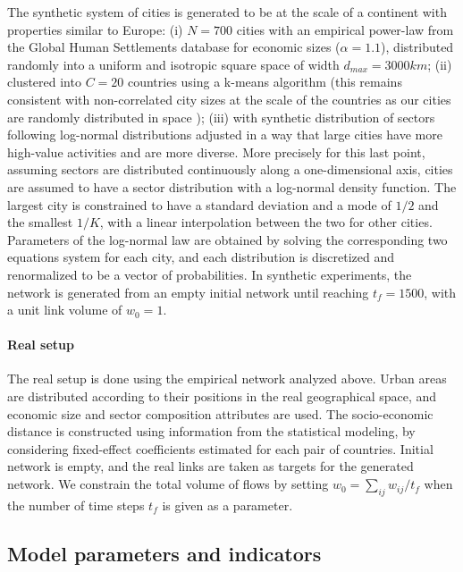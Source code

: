 \documentclass[11pt]{article}
\begin{document}
The synthetic system of cities is generated to be at the scale of a continent with properties similar to Europe: (i) $N=700$ cities with an empirical power-law from the Global Human Settlements database for economic sizes ($\alpha = 1.1$), distributed randomly into a uniform and isotropic square space of width $d_{max}=3000km$; (ii) clustered into $C = 20$ countries using a k-means algorithm (this remains consistent with non-correlated city sizes at the scale of the countries as our cities are randomly distributed in space \citep{simini2019testing}); (iii) with synthetic distribution of sectors following log-normal distributions adjusted in a way that large cities have more high-value activities and are more diverse. More precisely for this last point, assuming sectors are distributed continuously along a one-dimensional axis, cities are assumed to have a sector distribution with a log-normal density function. The largest city is constrained to have a standard deviation and a mode of $1/2$ and the smallest $1/K$, with a linear interpolation between the two for other cities. Parameters of the log-normal law are obtained by solving the corresponding two equations system for each city, and each distribution is discretized and renormalized to be a vector of probabilities. In synthetic experiments, the network is generated from an empty initial network until reaching $t_f=1500$, with a unit link volume of $w_0 = 1$.

     
\paragraph{Real setup}

The real setup is done using the empirical network analyzed above. Urban areas are distributed according to their positions in the real geographical space, and economic size and sector composition attributes are used. The socio-economic distance is constructed using information from the statistical modeling, by considering fixed-effect coefficients estimated for each pair of countries. Initial network is empty, and the real links are taken as targets for the generated network. We constrain the total volume of flows by setting $w_0 = \sum_{ij} w_{ij} / t_{f}$ when the number of time steps $t_f$ is given as a parameter.


\subsection{Model parameters and indicators}
\end{document}
